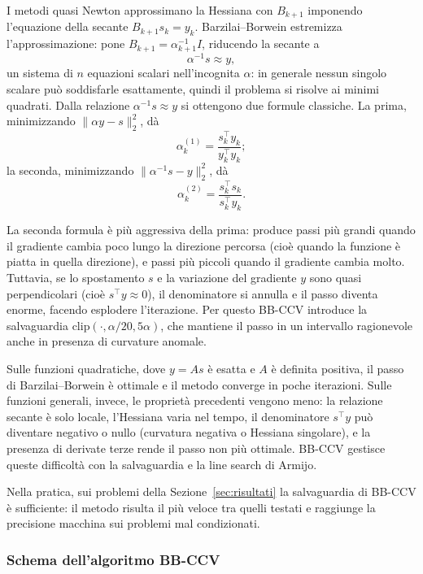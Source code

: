 \documentclass[a4paper,12pt]{article}
\numberwithin{equation}{section}
\numberwithin{figure}{section}
\numberwithin{table}{section}
\begin{document}
I metodi quasi Newton approssimano la Hessiana con $B_{k+1}$ imponendo
l'equazione della secante $B_{k+1} s_k = y_k$. Barzilai--Borwein estremizza
l'approssimazione: pone $B_{k+1} = \alpha_{k+1}^{-1} I$, riducendo la
secante a
\[
\alpha^{-1} s \approx y,
\]
un sistema di $n$ equazioni scalari nell'incognita $\alpha$: in generale
nessun singolo scalare può soddisfarle esattamente, quindi il problema si
risolve ai minimi quadrati. Dalla relazione $\alpha^{-1} s \approx y$ si
ottengono due formule classiche. La prima, minimizzando
$\|\alpha y - s\|_2^2$, dà
\[
\alpha_k^{(1)} = \frac{s_k^\top y_k}{y_k^\top y_k}; \tag{5.55}\label{eq:5_55}
\]
la seconda, minimizzando $\|\alpha^{-1} s - y\|_2^2$, dà
\[
\alpha_k^{(2)} = \frac{s_k^\top s_k}{s_k^\top y_k}. \tag{5.56}\label{eq:5_56}
\]

La seconda formula è più aggressiva della prima: produce passi più grandi
quando il gradiente cambia poco lungo la direzione percorsa (cioè quando la
funzione è piatta in quella direzione), e passi più piccoli quando il
gradiente cambia molto. Tuttavia, se lo spostamento $s$ e la variazione del
gradiente $y$ sono quasi perpendicolari (cioè $s^\top y \approx 0$), il
denominatore si annulla e il passo diventa enorme, facendo esplodere
l'iterazione. Per questo BB-CCV introduce la salvaguardia
$\mathrm{clip}(\cdot, \alpha/20, 5\alpha)$, che mantiene il passo in un
intervallo ragionevole anche in presenza di curvature anomale.

Sulle funzioni quadratiche, dove $y = A s$ è esatta e $A$ è definita positiva,
il passo di Barzilai--Borwein è ottimale e il metodo converge in poche
iterazioni. Sulle funzioni generali, invece, le proprietà precedenti vengono
meno: la relazione secante è solo locale, l'Hessiana varia nel tempo, il
denominatore $s^\top y$ può diventare negativo o nullo (curvatura negativa o
Hessiana singolare), e la presenza di derivate terze rende il passo non più
ottimale. BB-CCV gestisce queste difficoltà con la salvaguardia e la line
search di Armijo.

Nella pratica, sui problemi della Sezione~\ref{sec:risultati} la salvaguardia
di BB-CCV è sufficiente: il metodo risulta il più veloce tra quelli testati e
raggiunge la precisione macchina sui problemi mal condizionati.

\subsubsection{Schema dell'algoritmo BB-CCV}\label{sec:bbccv-schema}
\end{document}
